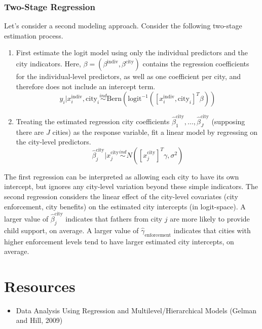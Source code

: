 \documentclass[12pt]{article}
\begin{document}
\subsubsection{Two-Stage Regression}
Let's consider a second modeling approach. Consider the following two-stage estimation process. 
\begin{enumerate}
\item First estimate the logit model using only the individual predictors and the city indicators. Here, $\beta = (\beta^{\text{indiv}}, \beta^{\text{city}})$ contains the regression coefficients for the individual-level 
predictors, as well as one coefficient per city, and therefore does not include an intercept term. 
\[y_i|x_i^{\text{indiv}}, \text{city}_i \overset{ind}{\sim} \text{Bern}(\text{logit}^{-1}([x_i^{\text{indiv}}, \text{city}_i]^T \beta)) \]
\item Treating the estimated regression city coefficients $\hat{\beta}^{\text{city}}_1, \dots, \hat{\beta}^{\text{city}}_J$ (supposing there are $J$ cities) as the response variable, fit a linear model by regressing on the 
city-level predictors. 
\[\hat{\beta}^{\text{city}}_j|x_j^{\text{city}} \overset{ind}{\sim} N([x_j^{\text{city}}]^T \gamma, \sigma^2)\]
\end{enumerate}
The first regression can be interpreted as allowing each city to have its own intercept, but ignores any city-level variation beyond these simple indicators. The second regression considers the linear effect of 
the city-level covariates (city enforcement, city benefits) on the estimated city intercepts (in logit-space). A larger value of $\hat{\beta}^{\text{city}}_j$ indicates that fathers from city $j$ are more likely to provide child support, on average. A larger value of $\hat{\gamma}_{\text{enforcement}}$ indicates that cities with higher enforcement levels tend to have larger estimated city intercepts, on average. 


\section{Resources}
\begin{itemize}
\item Data Analysis Using Regression and Multilevel/Hierarchical Models (Gelman and Hill, 2009)
\end{itemize}
\end{document}
